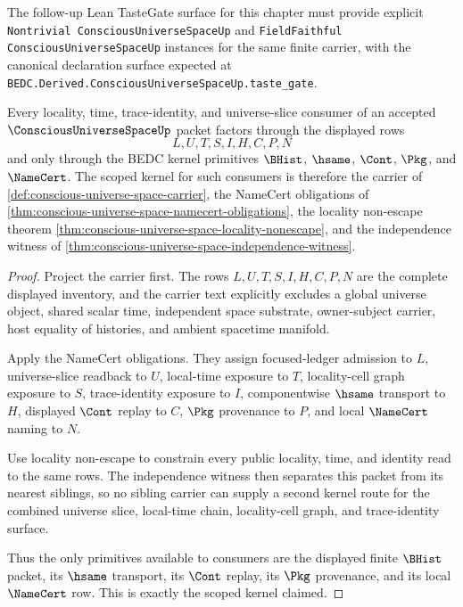 

The follow-up Lean TasteGate surface for this chapter must provide explicit \texttt{Nontrivial ConsciousUniverseSpaceUp} and \texttt{FieldFaithful ConsciousUniverseSpaceUp} instances for the same finite carrier, with the canonical declaration surface expected at \texttt{BEDC.Derived.ConsciousUniverseSpaceUp.taste\_gate}.

\begin{theorem}
\label{thm:conscious-universe-space-scoped-kernel-witness}
Every locality, time, trace-identity, and universe-slice consumer of an accepted $\ConsciousUniverseSpaceUp$ packet factors through the displayed rows
$$
L,U,T,S,I,H,C,P,N
$$
and only through the BEDC kernel primitives $\BHist$, $\hsame$, $\Cont$, $\Pkg$, and $\NameCert$. The scoped kernel for such consumers is therefore the carrier of \autoref{def:conscious-universe-space-carrier}, the NameCert obligations of \autoref{thm:conscious-universe-space-namecert-obligations}, the locality non-escape theorem \autoref{thm:conscious-universe-space-locality-nonescape}, and the independence witness of \autoref{thm:conscious-universe-space-independence-witness}.
\end{theorem}
\begin{proof}
Project the carrier first. The rows $L,U,T,S,I,H,C,P,N$ are the complete displayed inventory, and the carrier text explicitly excludes a global universe object, shared scalar time, independent space substrate, owner-subject carrier, host equality of histories, and ambient spacetime manifold.

Apply the NameCert obligations. They assign focused-ledger admission to $L$, universe-slice readback to $U$, local-time exposure to $T$, locality-cell graph exposure to $S$, trace-identity exposure to $I$, componentwise $\hsame$ transport to $H$, displayed $\Cont$ replay to $C$, $\Pkg$ provenance to $P$, and local $\NameCert$ naming to $N$.

Use locality non-escape to constrain every public locality, time, and identity read to the same rows. The independence witness then separates this packet from its nearest siblings, so no sibling carrier can supply a second kernel route for the combined universe slice, local-time chain, locality-cell graph, and trace-identity surface.

Thus the only primitives available to consumers are the displayed finite $\BHist$ packet, its $\hsame$ transport, its $\Cont$ replay, its $\Pkg$ provenance, and its local $\NameCert$ row. This is exactly the scoped kernel claimed.
\end{proof}

